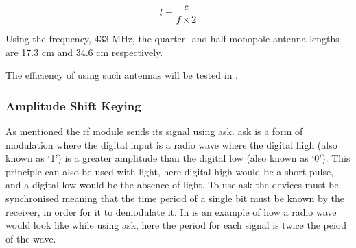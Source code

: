 \begin{equation}
l = \frac{c}{f \times 2}
\end{equation}

Using the frequency, 433 MHz, the quarter- and half-monopole antenna lengths are 17.3 cm and 34.6 cm respectively. \cite{AntennaLength}

The efficiency of using such antennas will be tested in .

\subsubsection{Amplitude Shift Keying}\label{subsub:ask}
As mentioned the \gls{rf} module sends its signal using \gls{ask}.
\gls{ask} is a form of modulation where the digital input is a radio wave where the digital high (also known as \enquote*{1}) is a greater amplitude than the digital low (also known as \enquote*{0}).
This principle can also be used with light, here digital high would be a short pulse, and a digital low would be the absence of light. 
To use \gls{ask} the devices must be synchronised meaning that the time period of a single bit must be known by the receiver, in order for it to demodulate it. 
In  is an example of how a radio wave would look like while using \gls{ask}, here the period for each signal is twice the peiod of the wave. \cite{ASKnFSK}

